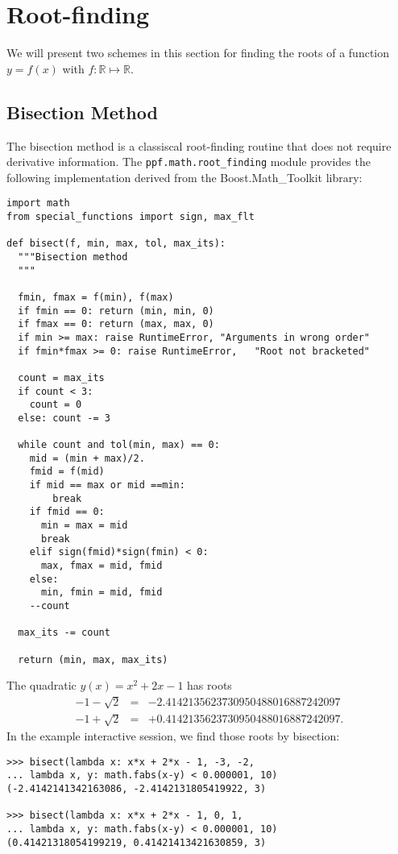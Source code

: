 \section{Root-finding}

We will present two schemes in this section for finding the roots of a
function $y = f(x)$ with $f: \mathbb R \mapsto \mathbb R$.

\subsection{Bisection Method}

The bisection method is a classiscal root-finding routine that does not
require derivative information. The \verb|ppf.math.root_finding|
module provides the following implementation derived from the
Boost.Math\_Toolkit library:

\begin{verbatim}
import math
from special_functions import sign, max_flt

def bisect(f, min, max, tol, max_its):
  """Bisection method
  """

  fmin, fmax = f(min), f(max)
  if fmin == 0: return (min, min, 0)
  if fmax == 0: return (max, max, 0)
  if min >= max: raise RuntimeError, "Arguments in wrong order"
  if fmin*fmax >= 0: raise RuntimeError,   "Root not bracketed"

  count = max_its
  if count < 3:
    count = 0
  else: count -= 3

  while count and tol(min, max) == 0:
    mid = (min + max)/2.
    fmid = f(mid)
    if mid == max or mid ==min:
        break
    if fmid == 0:
      min = max = mid
      break
    elif sign(fmid)*sign(fmin) < 0:
      max, fmax = mid, fmid
    else:
      min, fmin = mid, fmid
    --count

  max_its -= count

  return (min, max, max_its)
\end{verbatim}
The quadratic $y(x) = x^2 + 2x -1$ has roots
\begin{eqnarray*}
-1 - \sqrt{2} & = & -2.4142135623730950488016887242097\\
-1 + \sqrt{2} & = & +0.4142135623730950488016887242097.
\end{eqnarray*}
In the example interactive session, we find those roots by bisection:
\begin{verbatim}
>>> bisect(lambda x: x*x + 2*x - 1, -3, -2, 
... lambda x, y: math.fabs(x-y) < 0.000001, 10)
(-2.4142141342163086, -2.4142131805419922, 3)

>>> bisect(lambda x: x*x + 2*x - 1, 0, 1, 
... lambda x, y: math.fabs(x-y) < 0.000001, 10)
(0.41421318054199219, 0.41421413421630859, 3)
\end{verbatim}

